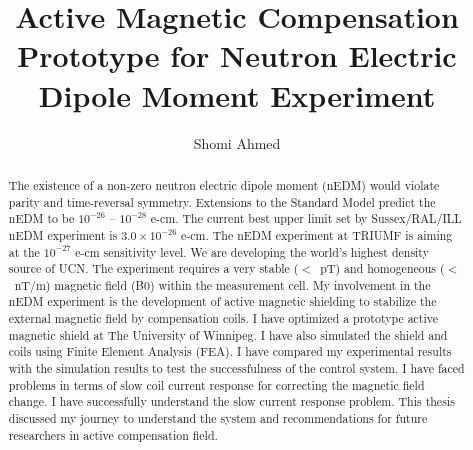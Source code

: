 
\title{Active Magnetic Compensation Prototype for Neutron Electric Dipole Moment Experiment}
\author{Shomi Ahmed}

%
%
%





\maketitle

\begin{abstract}
The existence of a non-zero neutron electric dipole moment (nEDM) would violate parity and time-reversal symmetry.  Extensions to the Standard Model predict the nEDM to be $10^{-26}$ -- $10^{-28}$ e-cm.  The current best upper limit set by Sussex/RAL/ILL nEDM experiment is $3.0 \times 10^{-26}$ e-cm\cite{bestLim_1,bestLim_2}.  The nEDM experiment at TRIUMF is aiming at the $10^{-27}$ e-cm sensitivity level.  We are developing the world's highest density source of UCN.  The experiment requires a very stable ($<$~pT) and homogeneous ($<$~nT/m) magnetic field (B0) within the measurement cell.  My involvement in the nEDM experiment is the development of active magnetic shielding to stabilize the external magnetic field by compensation coils.  I have optimized a prototype active magnetic shield at The University of Winnipeg. I have also simulated the shield and coils using Finite Element Analysis (FEA). I have compared my experimental results with the simulation results to test the successfulness of the control system. I have faced problems in terms of slow coil current response for correcting the magnetic field change. I have successfully understand the slow current response problem. This thesis discussed my journey to understand the system and recommendations for future researchers in active compensation field.


\end{abstract}


